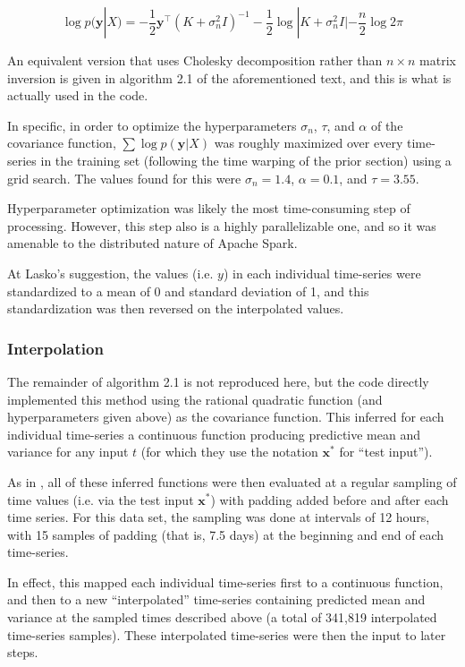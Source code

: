 \documentclass[journal]{IEEEtran}
\begin{document}
$$\log p(\mathbf{y}|X) = -\frac{1}{2}\mathbf{y}^\top(K+\sigma_n^2I)^{-1}-\frac{1}{2}\log |K+\sigma_n^2I|-\frac{n}{2}\log2\pi$$

An equivalent version that uses Cholesky decomposition rather than
$n\times n$ matrix inversion is given in algorithm 2.1 of the
aforementioned text, and this is what is actually used in the code.

In specific, in order to optimize the hyperparameters $\sigma_n$,
$\tau$, and $\alpha$ of the covariance function, $\sum\log
p(\mathbf{y}|X)$ was roughly maximized over every time-series in the
training set (following the time warping of the prior section) using a
grid search.  The values found for this were $\sigma_n=1.4$,
$\alpha=0.1$, and $\tau=3.55$.

Hyperparameter optimization was likely the most time-consuming step of
processing.  However, this step also is a highly parallelizable one,
and so it was amenable to the distributed nature of Apache Spark.

At Lasko's suggestion, the values (i.e. $y$) in each individual
time-series were standardized to a mean of 0 and standard deviation of
1, and this standardization was then reversed on the interpolated
values.


\subsubsection{Interpolation}

The remainder of algorithm 2.1 is not reproduced here, but the code
directly implemented this method using the rational quadratic function
(and hyperparameters given above) as the covariance function.  This
inferred for each individual time-series a continuous function
producing predictive mean and variance for any input $t$ (for which
they use the notation $\mathbf{x^*}$ for ``test input'').

As in \cite{Lasko2013}, all of these inferred functions were then
evaluated at a regular sampling of time values (i.e. via the test
input $\mathbf{x^*}$) with padding added before and after each time
series.  For this data set, the sampling was done at intervals of 12
hours, with 15 samples of padding (that is, 7.5 days) at the beginning
and end of each time-series.

In effect, this mapped each individual time-series first to a
continuous function, and then to a new ``interpolated'' time-series
containing predicted mean and variance at the sampled times described
above (a total of 341,819 interpolated time-series samples).  These
interpolated time-series were then the input to later steps.
\end{document}

